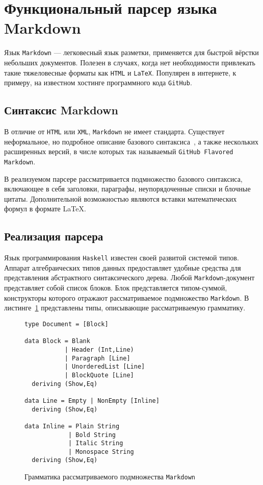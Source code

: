 \section{Функциональный парсер языка Markdown}

Язык \lstinline{Markdown} --- легковесный язык разметки, применяется для быстрой вёрстки небольших документов. Полезен в случаях, когда нет необходимости привлекать такие тяжеловесные форматы как \lstinline{HTML} и \lstinline{LaTeX}. Популярен в интернете, к примеру, на известном хостинге программного кода \lstinline{GitHub}.

\subsection{Синтаксис Markdown}

В отличие от \lstinline{HTML} или \lstinline{XML}, \lstinline{Markdown} не имеет стандарта. Существует неформальное, но подробное описание базового синтаксиса~\autocite{MarkdownSyntax}, а также нескольких расширенных версий, в числе которых так называемый \lstinline{GitHub Flavored Markdown}.

В реализуемом парсере рассматривается подмножество базового синтаксиса, включающее в себя заголовки, параграфы, неупорядоченные списки и блочные цитаты. Дополнительной возможностью являются вставки математических формул в формате \LaTeX.

\subsection{Реализация парсера}

Язык программирования \lstinline{Haskell} известен своей развитой системой типов. Аппарат алгебраических типов данных предоставляет удобные средства для представления абстрактного синтаксического дерева. Любой \lstinline{Markdown}-документ представляет собой список блоков. Блок представляется типом-суммой, конструкторы которого отражают рассматриваемое подмножество \lstinline{Markdown}. В листинге~\ref{listing:MarkdownADT} представлены типы, описывающие рассматриваемую грамматику.

\begin{figure}[t]
\begin{lstlisting}
type Document = [Block]

data Block = Blank
           | Header (Int,Line)
           | Paragraph [Line]
           | UnorderedList [Line]
           | BlockQuote [Line]
  deriving (Show,Eq)

data Line = Empty | NonEmpty [Inline]
  deriving (Show,Eq)

data Inline = Plain String
            | Bold String
            | Italic String
            | Monospace String
  deriving (Show,Eq)
\end{lstlisting}
\caption{Грамматика рассматриваемого подмножества \lstinline{Markdown}}
\label{listing:MarkdownADT}
\end{figure}


